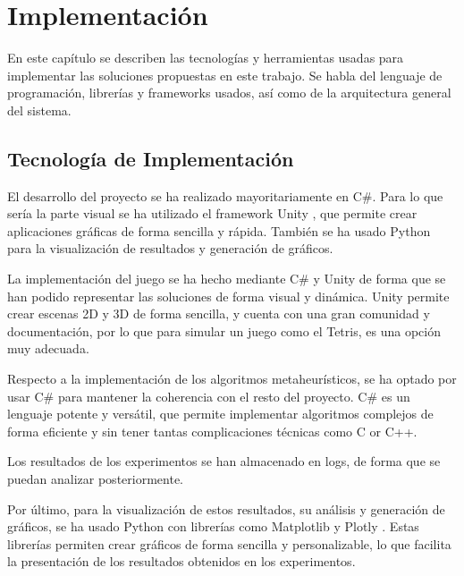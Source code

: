 \documentclass[11pt,spanish,listoffigures,listoftables]{tfgetsinf}
\begin{document}
    

\chapter{Implementación}
En este capítulo se describen las tecnologías y herramientas usadas para implementar las soluciones propuestas en este trabajo. Se habla del lenguaje de programación, librerías y frameworks usados, así como de la arquitectura general del sistema.

\section{Tecnología de Implementación}
El desarrollo del proyecto se ha realizado mayoritariamente en C\#. Para lo que sería la parte visual se ha utilizado el framework Unity \cite{}, que permite crear aplicaciones gráficas de forma sencilla y rápida. También se ha usado Python para la visualización de resultados y generación de gráficos.

La implementación del juego se ha hecho mediante C\# y Unity de forma que se han podido representar las soluciones de forma visual y dinámica. Unity permite crear escenas 2D y 3D de forma sencilla, y cuenta con una gran comunidad y documentación, por lo que para simular un juego como el Tetris, es una opción muy adecuada.

Respecto a la implementación de los algoritmos metaheurísticos, se ha optado por usar C\# para mantener la coherencia con el resto del proyecto. C\# es un lenguaje potente y versátil, que permite implementar algoritmos complejos de forma eficiente y sin tener tantas complicaciones técnicas como C or C++.

Los resultados de los experimentos se han almacenado en logs, de forma que se puedan analizar posteriormente.

Por último, para la visualización de estos resultados, su análisis y generación de gráficos, se ha usado Python con librerías como Matplotlib \cite{} y Plotly \cite{}. Estas librerías permiten crear gráficos de forma sencilla y personalizable, lo que facilita la presentación de los resultados obtenidos en los experimentos.
\end{document}
